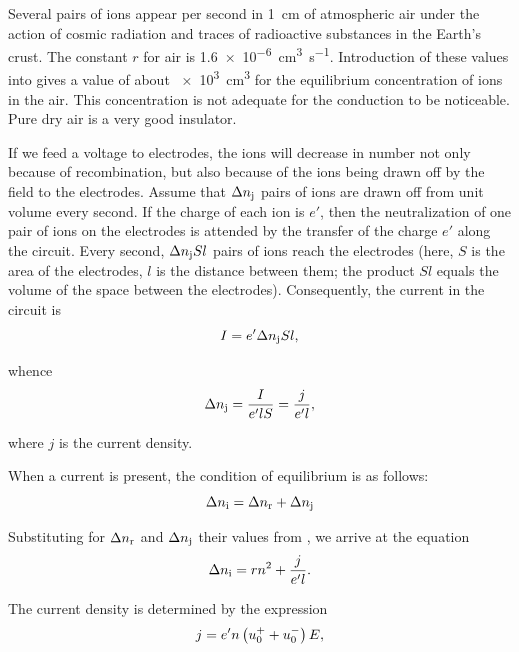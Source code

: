 Several pairs of ions appear per second in \SI{1}{\centi\metre} of atmospheric air under the action of cosmic radiation and traces of radioactive substances in the Earth's crust.
The constant $r$ for air is \SI{1.6e-6}{\centi\metre\cubed\per\second}.
Introduction of these values into  gives a value of about \SI{e3}{\centi\metre\cubed} for the equilibrium concentration of ions in the air.
This concentration is not adequate for the conduction to be noticeable.
Pure dry air is a very good insulator.

If we feed a voltage to electrodes, the ions will decrease in number not only because of recombination, but also because of the ions being drawn off by the field to the electrodes.
Assume that $\Delta{n_{\text{j}}}$ pairs of ions are drawn off from unit volume every second.
If the charge of each ion is $e'$, then the neutralization of one pair of ions on the electrodes is attended by the transfer of the charge $e'$ along the circuit.
Every second, $\Delta{n_{\text{j}}}Sl$ pairs of ions reach the electrodes (here, $S$ is the area of the electrodes, $l$ is the distance between them; the product $Sl$ equals the volume of the space between the electrodes).
Consequently, the current in the circuit is
\begin{equation*}
    I = e' \Delta{n_{\text{j}}} Sl,
\end{equation*}

\noindent
whence
\begin{equation}\label{eq:12_4}
    \Delta{n_{\text{j}}} = \frac{I}{e' l S} = \frac{j}{e' l},
\end{equation}

\noindent
where $j$ is the current density.

When a current is present, the condition of equilibrium is as follows:
\begin{equation*}
    \Delta{n_{\text{i}}} = \Delta{n_{\text{r}}} + \Delta{n_{\text{j}}}
\end{equation*}

\noindent
Substituting for $\Delta{n_{\text{r}}}$ and $\Delta{n_{\text{j}}}$ their values from , we arrive at the equation
\begin{equation}\label{eq:12_5}
    \Delta{n_{\text{i}}} = rn^2 + \frac{j}{e' l}.
\end{equation}

The current density is determined by the expression
\begin{equation}\label{eq:12_6}
    j = e' n \left(u_0^+ + u_0^-\right) E,
\end{equation}

